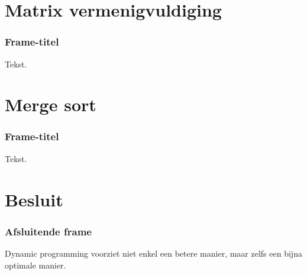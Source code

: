 \documentclass
   [kulak] %
   {kulakbeamer}
\begin{document}
\section[Matrix]{Matrix vermenigvuldiging}

\begin{frame}
	\frametitle{Frame-titel}
	Tekst.
\end{frame}

\section[Merge sort]{Merge sort}

\begin{frame}
	\frametitle{Frame-titel}
	Tekst.
\end{frame}

\section{Besluit}
\begin{frame}
\frametitle{Afsluitende frame}
Dynamic programming voorziet niet enkel een betere manier, maar zelfs een bijna optimale manier.
\end{frame}
\end{document}
